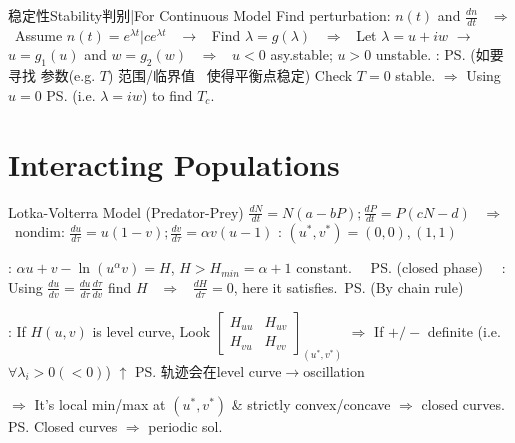 \documentclass{note}
\begin{document}
\begin{MyTh}{稳定性Stability判别|For Continuous Model}
    Find perturbation: $n(t)$ and $\frac{dn}{dt}$ \ $\Rightarrow$ \ Assume $n(t)=e^{\lambda t}|ce^{\lambda t}$ \ $\to$ \ Find $\lambda=g(\lambda)$ \ $\Rightarrow$ \ Let $\lambda=u+iw$ $\to$ $u=g_1(u)$ and $w=g_2(w)$ \ $\Rightarrow$ \ $u<0$ asy.stable; $u>0$ unstable. \quad {}: \ps{\tiny (如要寻找 参数(e.g. $T$) 范围/临界值 \ 使得平衡点稳定)} Check $T=0$ stable. $\Rightarrow$ Using $u=0$ \ps{\tiny (i.e. $\lambda=iw$)} to find $T_c$.
\end{MyTh}

\section{Interacting Populations}

\begin{MyTh}{Lotka-Volterra Model {\tiny (Predator-Prey)}}
    $\frac{dN}{dt}=N(a-bP); \frac{dP}{dt}=P(cN-d)$ \ $\Rightarrow$ \ nondim: $\frac{du}{d\tau}=u(1-v); \frac{dv}{d\tau}=\alpha v(u-1)$ \quad {}: $(u^*,v^*)=(0,0),(1,1)$

    {\footnotesize \quad {}: $\alpha u+v-\ln(u^\alpha v)=H$, $H>H_{min}=\alpha+1$ constant. \ \ \ps{\tiny (closed phase)}  \ \ : Using $\frac{du}{dv}=\frac{du}{d\tau}\frac{d\tau}{dv}$ find $H$ \ $\Rightarrow$ \ $\frac{dH}{d\tau}=0$, here it satisfies.\ \ps{\tiny (By chain rule)}}

    {\footnotesize \quad {}: If $H(u,v)$ is level curve, Look $\left[\begin{smallmatrix}H_{uu} & H_{uv} \\ H_{vu} & H_{vv}\end{smallmatrix}\right]_{(u^*,v^*)}$ $\Rightarrow$ If $+/-$ definite (i.e. $\forall\lambda_i>0(<0)$) \qquad $\uparrow$ \ps{\tiny 轨迹会在level curve$\to$oscillation}}

    \vspace{-3pt}
    {\footnotesize \quad\qquad $\Rightarrow$ It's local min/max at $(u^*,v^*)$ \& strictly convex/concave $\Rightarrow$ closed curves. \qquad \ps{Closed curves $\Rightarrow$ periodic sol.}}
\end{MyTh}
\end{document}
